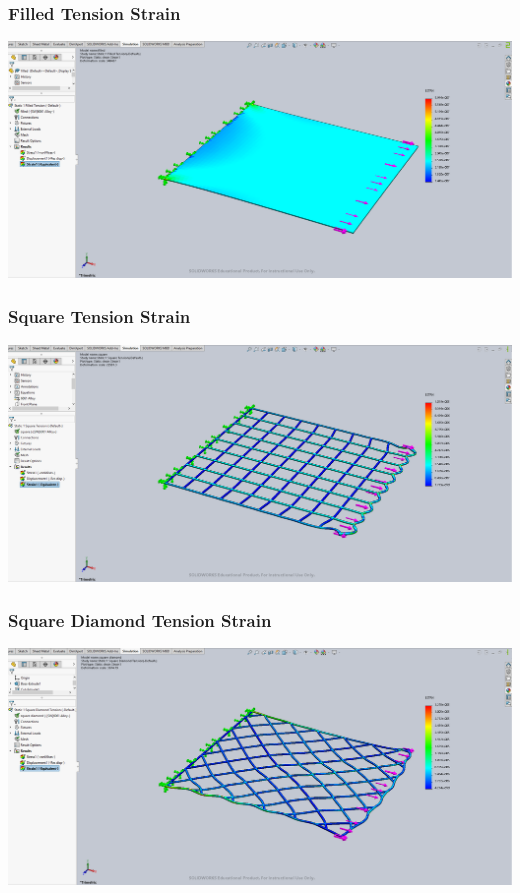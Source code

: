 \documentclass[12pt, letterpaper]{article}
\begin{document}
\begin{singlespace}
\subsubsection{Filled Tension Strain}
\label{ap:f-te-es}
\includegraphics[width=0.8\linewidth]{./graphs/tension/filled-tension-strain}

\subsubsection{Square Tension Strain}
\label{ap:s-te-es}
\includegraphics[width=0.8\linewidth]{./graphs/tension/square-tension-strain}

\subsubsection{Square Diamond Tension Strain}
\label{ap:sd-te-es}
\includegraphics[width=0.8\linewidth]{./graphs/tension/square-diamond-tension-strain}


\end{singlespace}
\end{document}
